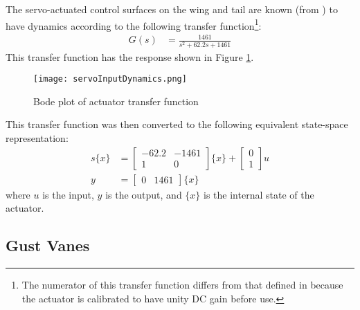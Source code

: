 The servo-actuated control surfaces on the wing and tail are known (from \cite{Quenzer2019}) to have dynamics according to the following transfer function\footnote{The numerator of this transfer function differs from that defined in \cite{Quenzer2019} because the actuator is calibrated to have unity DC gain before use.}:
\begin{align}
    G(s) &= \frac{1461}{s^2 + 62.2s + 1461}
\end{align}
This transfer function has the response shown in Figure \ref{fig:servoInputDynamics}.
\begin{figure}[H]
	\centering
	\texttt{[image: servoInputDynamics.png]}
	\caption{Bode plot of actuator transfer function}
	\label{fig:servoInputDynamics}
\end{figure}
This transfer function was then converted to the following equivalent state-space representation:
\begin{equation}
\begin{aligned}
    \label{eq:servoModel}
    s\{x\} &= \begin{bmatrix} -62.2 & -1461 \\ 1 & 0 \end{bmatrix} \{x\}
        + \begin{bmatrix} 0 \\ 1 \end{bmatrix} u \\
    y &= \begin{bmatrix} 0 & 1461 \end{bmatrix} \{x\}
\end{aligned}
\end{equation}
where $u$ is the input, $y$ is the output, and $\{x\}$ is the internal state of the actuator.

\subsection{Gust Vanes} %

